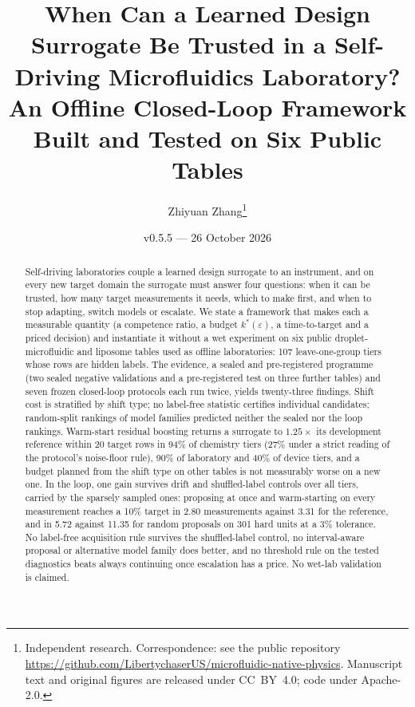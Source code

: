 \documentclass[11pt,a4paper]{article}
\title{When Can a Learned Design Surrogate Be Trusted in a Self-Driving Microfluidics Laboratory?\\
An Offline Closed-Loop Framework Built and Tested on Six Public Tables}
\author{Zhiyuan Zhang\thanks{Independent research. Correspondence: see the public
  repository \url{https://github.com/LibertychaserUS/microfluidic-native-physics}.
  Manuscript text and original figures are released under CC~BY~4.0; code under
  Apache-2.0.}}
\date{v0.5.5 --- 26 October 2026}
\begin{document}
\maketitle

\begin{abstract}
Self-driving laboratories couple a learned design surrogate to an instrument,
and on every new target domain the surrogate must answer four questions: when
it can be trusted, how many target measurements it needs, which to make first,
and when to stop adapting, switch models or escalate. We state a framework that
makes each a measurable quantity (a competence ratio, a budget $k^{*}(\varepsilon)$, a time-to-target and a
priced decision) and instantiate it without a wet experiment on six public
droplet-microfluidic and liposome tables used as offline laboratories: 107
leave-one-group tiers whose rows are hidden labels. The evidence, a sealed and pre-registered programme (two sealed
negative validations and a pre-registered test on three further tables) and
seven frozen closed-loop protocols each run twice, yields twenty-three
findings. Shift cost is
stratified by shift type; no label-free statistic certifies individual
candidates; random-split rankings of model families predicted neither the
sealed nor the loop rankings. Warm-start residual boosting returns a surrogate
to $1.25\times$ its development reference within 20 target rows in 94\% of
chemistry tiers (27\% under a strict reading of the protocol's noise-floor
rule), 90\% of laboratory and 40\% of device tiers, and a budget planned from
the shift type on other tables is not measurably worse on a new one. In the
loop, one gain survives drift and shuffled-label controls over all tiers,
carried by the sparsely sampled ones: proposing at once and warm-starting on
every measurement reaches a 10\% target in 2.80 measurements against 3.31 for
the reference, and in 5.72 against 11.35 for random proposals on 301 hard
units at a 3\% tolerance. No label-free acquisition rule survives the
shuffled-label control, no interval-aware proposal or alternative model family
does better, and no threshold rule on the tested diagnostics beats always
continuing once escalation has a price. No wet-lab validation is claimed.
\end{abstract}
\end{document}
